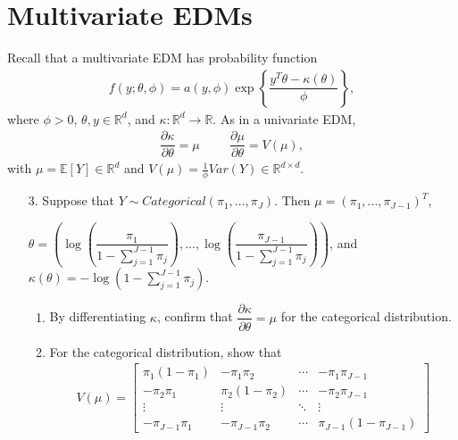 \documentclass[11pt]{article}
\begin{document}
\begin{enumerate}
\begin{enumerate}
\end{enumerate}
\end{enumerate}

\vspace{0.5cm}

\section*{Multivariate EDMs}

Recall that a multivariate EDM has probability function
\begin{align*}
f(y; \theta, \phi) = a(y, \phi) \exp \left\lbrace \dfrac{y^T \theta - \kappa(\theta)}{\phi} \right\rbrace,
\end{align*}
where $\phi > 0$, $\theta, y \in \mathbb{R}^d$, and $\kappa: \mathbb{R}^d \to \mathbb{R}$. As in a univariate EDM,
\begin{align*}
\dfrac{\partial \kappa}{\partial \theta} = \mu \hspace{1cm} \dfrac{\partial \mu}{\partial \theta} = V(\mu),
\end{align*}
with $\mu = \mathbb{E}[Y] \in \mathbb{R}^d$ and $V(\mu) = \frac{1}{\phi} Var(Y) \in \mathbb{R}^{d \times d}$.

\begin{enumerate}
\item[3.] Suppose that $Y \sim Categorical(\pi_{1},...,\pi_{J})$. Then $\mu = (\pi_1,...,\pi_{J-1})^T$, 

$\theta = \left( \log \left(\dfrac{\pi_1}{1 - \sum_{j=1}^{J-1} \pi_j} \right), ..., \log \left( \dfrac{\pi_{J-1}}{1 - \sum_{j=1}^{J-1} \pi_j} \right) \right)$, and $\kappa(\theta) = -\log\left(1 - \sum \limits_{j=1}^{J-1} \pi_j \right)$.

\begin{enumerate}
\item By differentiating $\kappa$, confirm that $\dfrac{\partial \kappa}{\partial \theta} = \mu$ for the categorical distribution.

\item For the categorical distribution, show that
\begin{align*}
V(\mu) = \begin{bmatrix}
\pi_1(1 - \pi_1) & -\pi_1 \pi_2 & \cdots & - \pi_1 \pi_{J-1} \\
-\pi_2 \pi_1 & \pi_2(1 - \pi_2) & \cdots & - \pi_2 \pi_{J-1} \\
\vdots & \vdots & \ddots & \vdots \\
-\pi_{J-1} \pi_1 &  -\pi_{J-1} \pi_2 & \cdots & \pi_{J-1}(1 - \pi_{J-1})
\end{bmatrix}
\end{align*}
\end{enumerate}
\end{enumerate}
\end{document}
